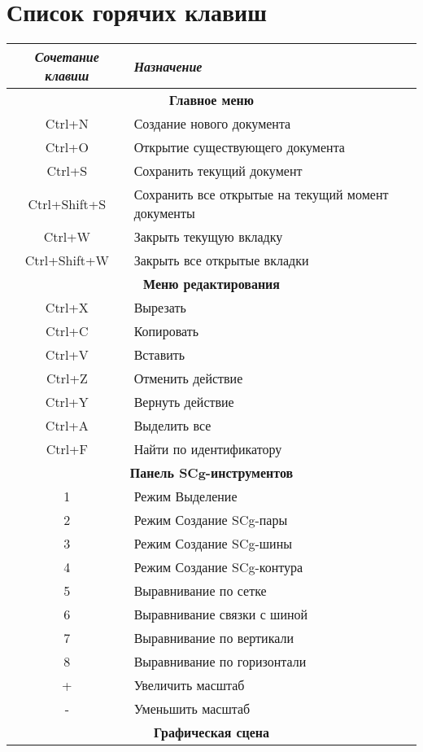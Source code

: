 \section{Список горячих клавиш}

\begin{tabular}{|c|l|}
\hline
\textit{Сочетание клавиш} & \textit{Назначение} \\
\hline
\multicolumn{2}{|c|}{\textbf{Главное меню}} \\
\hline
Ctrl+N & Создание нового документа \\
\hline
Ctrl+O & Открытие существующего документа \\
\hline
Ctrl+S & Сохранить текущий документ \\
\hline
Ctrl+Shift+S & Сохранить все открытые на текущий момент документы \\
\hline
Ctrl+W & Закрыть текущую вкладку \\
\hline
Ctrl+Shift+W & Закрыть все открытые вкладки\\
\hline
\multicolumn{2}{|c|}{\textbf{Меню редактирования}} \\
\hline
Ctrl+X & Вырезать \\
\hline
Ctrl+C & Копировать\\
\hline
Ctrl+V & Вставить \\
\hline
Ctrl+Z & Отменить действие \\
\hline
Ctrl+Y & Вернуть действие \\
\hline
Ctrl+A & Выделить все \\
\hline
Ctrl+F & Найти по идентификатору \\
\hline
\multicolumn{2}{|c|}{\textbf{Панель SCg-инструментов}} \\
\hline
1 & Режим Выделение\\
\hline
2 & Режим Создание SCg-пары \\
\hline
3 & Режим Создание SCg-шины \\
\hline
4 & Режим Создание SCg-контура \\
\hline
5 & Выравнивание по сетке \\
\hline
6 & Выравнивание связки с шиной \\
\hline
7 & Выравнивание по вертикали \\
\hline
8 & Выравнивание по горизонтали \\
\hline
+ & Увеличить масштаб \\
\hline
- & Уменьшить масштаб \\
\hline
\multicolumn{2}{|c|}{\textbf{Графическая сцена}} \\

\end{tabular}
